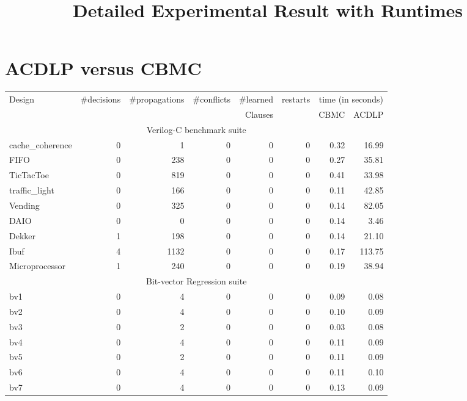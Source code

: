 \documentclass{article}
\begin{document}
\title{Detailed Experimental Result with Runtimes}
\maketitle 
\date{}
\section{ACDLP versus CBMC}
%
\begin{table}[!b]
\begin{center}
{
\begin{tabular}{l|r|r|r|r|r|r|r}
\hline
  Design & \#decisions & \#propagations & \#conflicts & \#learned  &
  restarts & \multicolumn{2}{c}{time (in seconds)} \\ 
  \cline{7-8}
  & & & & Clauses & & CBMC & ACDLP \\ \hline
  \multicolumn{8}{c}{Verilog-C benchmark suite} \\ \hline 
  cache\_coherence & 0 & 1 & 0 & 0 & 0 & 0.32 & 16.99 \\ \hline  
  FIFO & 0 & 238 & 0 & 0 & 0 & 0.27 & 35.81 \\ \hline
  TicTacToe & 0 & 819 & 0 & 0 & 0 & 0.41 & 33.98 \\ \hline
  traffic\_light & 0 & 166 & 0 & 0 & 0 & 0.11 & 42.85 \\ \hline
  Vending & 0 & 325 & 0 & 0 & 0 & 0.14 & 82.05 \\ \hline 
  DAIO & 0 & 0 & 0 & 0 & 0 & 0.14 & 3.46 \\ \hline 
  Dekker & 1 & 198 & 0 & 0 & 0 & 0.14 & 21.10 \\ \hline 
  Ibuf & 4 & 1132 & 0 & 0 & 0 & 0.17 & 113.75 \\ \hline
  Microprocessor & 1 & 240 & 0 & 0 & 0 & 0.19 & 38.94 \\ \hline
  \multicolumn{8}{c}{Bit-vector Regression suite} \\ \hline 
  bv1 & 0 & 4 & 0 & 0 & 0 & 0.09 & 0.08 \\ \hline
  bv2 & 0 & 4 & 0 & 0 & 0 & 0.10 & 0.09 \\ \hline
  bv3 & 0 & 2 & 0 & 0 & 0 & 0.03 & 0.08 \\ \hline
  bv4 & 0 & 4 & 0 & 0 & 0 & 0.11 & 0.09 \\ \hline
  bv5 & 0 & 2 & 0 & 0 & 0 & 0.11 & 0.09 \\ \hline
  bv6 & 0 & 4 & 0 & 0 & 0 & 0.11 & 0.10 \\ \hline 
  bv7 & 0 & 4 & 0 & 0 & 0 & 0.13 & 0.09 \\ \hline 

\end{tabular}}
\end{center}
\end{table}
\end{document}
